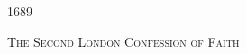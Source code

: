 \documentclass[12pt,letterpaper]{book}
\begin{document}
\begin{titlepage}
    \centering
    {\scshape\Large 1689 \par}
    \vspace{0.5cm}
    {\scshape\LARGE The Second London Confession of Faith \par}
    \vspace{0.5cm}
    \vfill
\end{titlepage}
\end{document}

